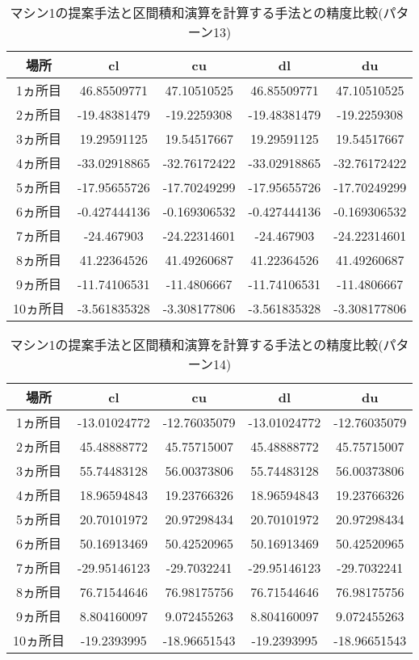 \documentclass[11pt,a4paper]{jsreport}
\theoremstyle{definition}
\begin{document}
\begin{table}[H]
\centering
\begin{tabular}{|c|c|c|c|c|}
\hline
場所 & cl & cu & dl & du \\ \hline
1ヵ所目 & 46.85509771 & 47.10510525 & 46.85509771 & 47.10510525 \\ \hline
2ヵ所目 & -19.48381479 & -19.2259308 & -19.48381479 & -19.2259308 \\ \hline
3ヵ所目 & 19.29591125 & 19.54517667 & 19.29591125 & 19.54517667 \\ \hline
4ヵ所目 & -33.02918865 & -32.76172422 & -33.02918865 & -32.76172422 \\ \hline
5ヵ所目 & -17.95655726 & -17.70249299 & -17.95655726 & -17.70249299 \\ \hline
6ヵ所目 & -0.427444136 & -0.169306532 & -0.427444136 & -0.169306532 \\ \hline
7ヵ所目 & -24.467903 & -24.22314601 & -24.467903 & -24.22314601 \\ \hline
8ヵ所目 & 41.22364526 & 41.49260687 & 41.22364526 & 41.49260687 \\ \hline
9ヵ所目 & -11.74106531 & -11.4806667 & -11.74106531 & -11.4806667 \\ \hline
10ヵ所目 & -3.561835328 & -3.308177806 & -3.561835328 & -3.308177806 \\ \hline
\end{tabular}
\caption{マシン1の提案手法と区間積和演算を計算する手法との精度比較(パターン13)}
\end{table}



\begin{table}[H]
\centering
\begin{tabular}{|c|c|c|c|c|}
\hline
場所 & cl & cu & dl & du \\ \hline
1ヵ所目 & -13.01024772 & -12.76035079 & -13.01024772 & -12.76035079 \\ \hline
2ヵ所目 & 45.48888772 & 45.75715007 & 45.48888772 & 45.75715007 \\ \hline
3ヵ所目 & 55.74483128 & 56.00373806 & 55.74483128 & 56.00373806 \\ \hline
4ヵ所目 & 18.96594843 & 19.23766326 & 18.96594843 & 19.23766326 \\ \hline
5ヵ所目 & 20.70101972 & 20.97298434 & 20.70101972 & 20.97298434 \\ \hline
6ヵ所目 & 50.16913469 & 50.42520965 & 50.16913469 & 50.42520965 \\ \hline
7ヵ所目 & -29.95146123 & -29.7032241 & -29.95146123 & -29.7032241 \\ \hline
8ヵ所目 & 76.71544646 & 76.98175756 & 76.71544646 & 76.98175756 \\ \hline
9ヵ所目 & 8.804160097 & 9.072455263 & 8.804160097 & 9.072455263 \\ \hline
10ヵ所目 & -19.2393995 & -18.96651543 & -19.2393995 & -18.96651543 \\ \hline
\end{tabular}
\caption{マシン1の提案手法と区間積和演算を計算する手法との精度比較(パターン14)}
\end{table}
\end{document}
